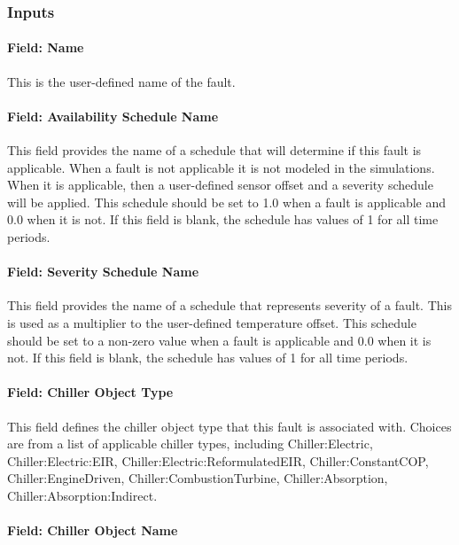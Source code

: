 \subsubsection{Inputs}

\paragraph{Field: Name}

This is the user-defined name of the fault.

\paragraph{Field: Availability Schedule Name}

This field provides the name of a schedule that will determine if this fault is applicable. When a fault is not applicable it is not modeled in the simulations. When it is applicable, then a user-defined sensor offset and a severity schedule will be applied. This schedule should be set to 1.0 when a fault is applicable and 0.0 when it is not. If this field is blank, the schedule has values of 1 for all time periods.

\paragraph{Field: Severity Schedule Name}\label{field-severity-schedule-name}

This field provides the name of a schedule that represents severity of a fault. This is used as a multiplier to the user-defined temperature offset. This schedule should be set to a non-zero value when a fault is applicable and 0.0 when it is not. If this field is blank, the schedule has values of 1 for all time periods.

\paragraph{Field: Chiller Object Type}\label{field-chiller-object-type}

This field defines the chiller object type that this fault is associated with. Choices are from a list of applicable chiller types, including Chiller:Electric, Chiller:Electric:EIR, Chiller:Electric:ReformulatedEIR,  Chiller:ConstantCOP, Chiller:EngineDriven, Chiller:CombustionTurbine, Chiller:Absorption, Chiller:Absorption:Indirect.

\paragraph{Field: Chiller Object Name}\label{field-chiller-object-name}

